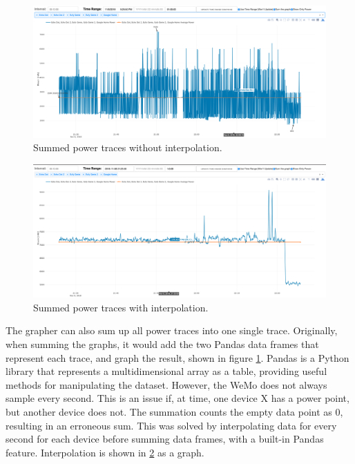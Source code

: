 \begin{figure}[H]
    \centering
    \includegraphics[width=1\textwidth]{figures/noninterpolated.png}
    \caption{Summed power traces without interpolation.}
    \label{fig:noninterpolated}
\end{figure}

\begin{figure}[H]
    \centering
    \includegraphics[width=1\textwidth]{figures/interpolated.png}
    \caption{Summed power traces with interpolation.}
    \label{fig:interpolated}
\end{figure}

The grapher can also sum up all power traces into one single trace. Originally, when summing the graphs, it would add the two Pandas \cite{pandas} data frames that represent each trace, and graph the result, shown in figure \ref{fig:noninterpolated}. Pandas is a Python library that represents a multidimensional array as a table, providing useful methods for manipulating the dataset. However, the WeMo does not always sample every second. This is an issue if, at time, one device X has a power point, but another device does not. The summation counts the empty data point as 0, resulting in an erroneous sum. This was solved by interpolating data for every second for each device before summing data frames, with a built-in Pandas feature. Interpolation is shown in \ref{fig:interpolated} as a graph.

